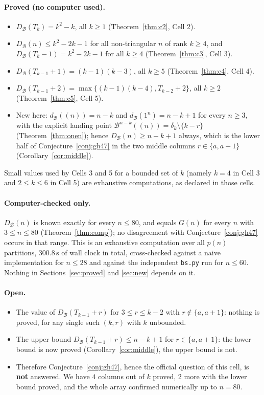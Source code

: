 \documentclass[11pt]{article}
\theoremstyle{definition}
\newcommand{\B}{\mathcal{B}}
\newcommand{\dB}{d_{\mathcal{B}}}
\newcommand{\DB}{D_{\mathcal{B}}}
\renewcommand{\le}{\leqslant}
\renewcommand{\ge}{\geqslant}
\newcommand{\NMAX}{80}
\newcommand{\TOTALSEC}{300.8\,\mathrm{s}}
\begin{document}
\paragraph{Proved (no computer used).}
\begin{itemize}
\item $\DB(T_k)=k^2-k$, all $k\ge1$ (Theorem~\ref{thm:c2}, Cell 2).
\item $\DB(n)\le k^2-2k-1$ for all non-triangular $n$ of rank $k\ge4$, and $\DB(T_k-1)=k^2-2k-1$ for all $k\ge4$
(Theorem~\ref{thm:c3}, Cell 3).
\item $\DB(T_{k-1}+1)=(k-1)(k-3)$, all $k\ge5$ (Theorem~\ref{thm:c4}, Cell 4).
\item $\DB(T_{k-1}+2)=\max\{(k-1)(k-4),T_{k-2}+2\}$, all $k\ge2$ (Theorem~\ref{thm:c5}, Cell 5).
\item New here: $\dB((n))=n-k$ and $\dB(1^n)=n-k+1$ for every $n\ge3$, with the explicit landing point
$\B^{n-k}((n))=\delta_k\setminus\{k-r\}$ (Theorem~\ref{thm:onen}); hence $\DB(n)\ge n-k+1$ always, which is the
lower half of Conjecture~\ref{conj:gh47} in the two middle columns $r\in\{a,a+1\}$ (Corollary~\ref{cor:middle}).
\end{itemize}
Small values used by Cells 3 and 5 for a bounded set of $k$ (namely $k=4$ in Cell 3 and $2\le k\le6$ in Cell 5) are
exhaustive computations, as declared in those cells.

\paragraph{Computer-checked only.}
$\DB(n)$ is known exactly for every $n\le\NMAX$, and equals $G(n)$ for every $n$ with $3\le n\le\NMAX$
(Theorem~\ref{thm:comp}); no disagreement with Conjecture~\ref{conj:gh47} occurs in that range.  This is an
exhaustive computation over all $p(n)$ partitions, $\TOTALSEC$ of wall clock in total, cross-checked against a
naive implementation for $n\le28$ and against the independent \texttt{bs.py} run for $n\le60$.  Nothing in
Sections~\ref{sec:proved} and \ref{sec:new} depends on it.

\paragraph{Open.}
\begin{itemize}
\item The value of $\DB(T_{k-1}+r)$ for $3\le r\le k-2$ with $r\notin\{a,a+1\}$: nothing is proved, for any single
such $(k,r)$ with $k$ unbounded.
\item The upper bound $\DB(T_{k-1}+r)\le n-k+1$ for $r\in\{a,a+1\}$: the lower bound is now proved
(Corollary~\ref{cor:middle}), the upper bound is not.
\item Therefore Conjecture~\ref{conj:gh47}, hence the official question of this cell, is \textbf{not} answered.  We
have $4$ columns out of $k$ proved, $2$ more with the lower bound proved, and the whole array confirmed
numerically up to $n=\NMAX$.
\end{itemize}
\end{document}
